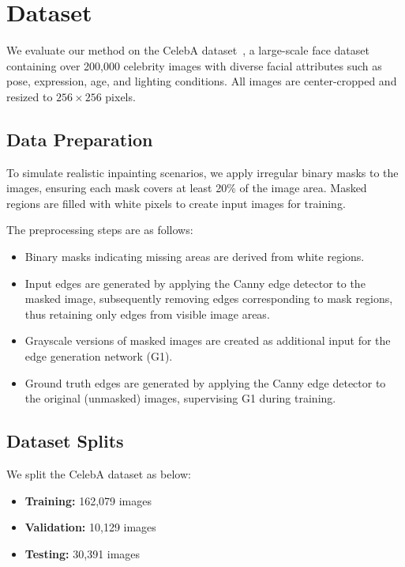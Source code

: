 \documentclass[10pt,twocolumn,letterpaper]{article}
\begin{document}
\section{Dataset}

We evaluate our method on the CelebA dataset~\cite{liu2015deep}, a large-scale face dataset containing over 200,000 celebrity images with diverse facial attributes such as pose, expression, age, and lighting conditions. All images are center-cropped and resized to $256 \times 256$ pixels.

\subsection{Data Preparation}

To simulate realistic inpainting scenarios, we apply irregular binary masks to the images, ensuring each mask covers at least 20\% of the image area. Masked regions are filled with white pixels to create input images for training.

The preprocessing steps are as follows:
\begin{itemize}
    \item Binary masks indicating missing areas are derived from white regions.
    \item Input edges are generated by applying the Canny edge detector to the masked image, subsequently removing edges corresponding to mask regions, thus retaining only edges from visible image areas.
    \item Grayscale versions of masked images are created as additional input for the edge generation network (G1).
    \item Ground truth edges are generated by applying the Canny edge detector to the original (unmasked) images, supervising G1 during training.
\end{itemize}



\subsection{Dataset Splits}

We split the CelebA dataset as below:
\begin{itemize}
    \item \textbf{Training:} 162,079 images
    \item \textbf{Validation:} 10,129 images
    \item \textbf{Testing:} 30,391 images
\end{itemize}
\end{document}
